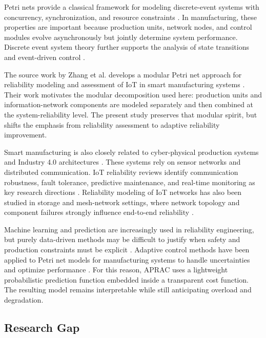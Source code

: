 \documentclass[journal]{IEEEtran}
\begin{document}
Petri nets provide a classical framework for modeling discrete-event systems with concurrency, synchronization, and resource constraints \cite{murata1989petri}. In manufacturing, these properties are important because production units, network nodes, and control modules evolve asynchronously but jointly determine system performance. Discrete event system theory further supports the analysis of state transitions and event-driven control \cite{cassandras2008discrete}.

The source work by Zhang et al. develops a modular Petri net approach for reliability modeling and assessment of IoT in smart manufacturing systems \cite{zhang2025iotpetri,zhang2018petrimanufacturing}. Their work motivates the modular decomposition used here: production units and information-network components are modeled separately and then combined at the system-reliability level. The present study preserves that modular spirit, but shifts the emphasis from reliability assessment to adaptive reliability improvement.

Smart manufacturing is also closely related to cyber-physical production systems and Industry 4.0 architectures \cite{lee2015cyberphysical,monostori2014cyberphysical,wang2016cloudmanufacturing,liu2019iotmanufacturing}. These systems rely on sensor networks and distributed communication. IoT reliability reviews identify communication robustness, fault tolerance, predictive maintenance, and real-time monitoring as key research directions \cite{moore2020iotreliability,moore2019iotreliability}. Reliability modeling of IoT networks has also been studied in storage and mesh-network settings, where network topology and component failures strongly influence end-to-end reliability \cite{xing2017meshiot,levitin2017reliability}.

Machine learning and prediction are increasingly used in reliability engineering, but purely data-driven methods may be difficult to justify when safety and production constraints must be explicit \cite{xu2021mlreliability,xu2019mlreliability}. Adaptive control methods have been applied to Petri net models for manufacturing systems to handle uncertainties and optimize performance \cite{shi2006adaptive,shi2010petrimanufacturing}. For this reason, APRAC uses a lightweight probabilistic prediction function embedded inside a transparent cost function. The resulting model remains interpretable while still anticipating overload and degradation.

\subsection{Research Gap}
\end{document}
